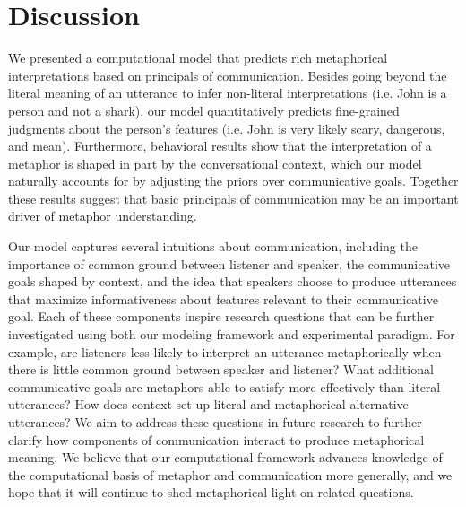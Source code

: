 \documentclass[10pt,letterpaper]{article}
\begin{document}
\section{Discussion}
We presented a computational model that predicts rich metaphorical interpretations based on principals of communication. Besides going beyond the literal meaning of an utterance to infer non-literal interpretations (i.e. John is a person and not a shark), our model quantitatively predicts fine-grained judgments about the person's features (i.e. John is very likely scary, dangerous, and mean). Furthermore, behavioral results show that the interpretation of a metaphor is shaped in part by the conversational context, which our model naturally accounts for by adjusting the priors over communicative goals. Together these results suggest that basic principals of communication may be an important driver of metaphor understanding.

Our model captures several intuitions about communication, including the importance of common ground between listener and speaker, the communicative goals shaped by context, and the idea that speakers choose to produce utterances that maximize informativeness about features relevant to their communicative goal. Each of these components inspire research questions that can be further investigated using both our modeling framework and experimental paradigm. For example, are listeners less likely to interpret an utterance metaphorically when there is little common ground between speaker and listener? What additional communicative goals are metaphors able to satisfy more effectively than literal utterances? How does context set up literal and metaphorical alternative utterances? We aim to address these questions in future research to further clarify how components of communication interact to produce metaphorical meaning. We believe that our computational framework advances knowledge of the computational basis of metaphor and communication more generally, and we hope that it will continue to shed metaphorical light on related questions.






\setlength{\bibleftmargin}{.125in}
\setlength{\bibindent}{-\bibleftmargin}


\end{document}
